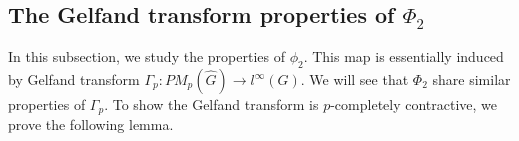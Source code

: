 \documentclass[reqno,11pt]{amsart}
\theoremstyle{plain}
\theoremstyle{definition}
\theoremstyle{remark}
\begin{document}
\subsection{The Gelfand transform properties of $\Phi_2$}


In this subsection, we study the properties of $\phi_2$. This map is essentially  induced by Gelfand transform $\Gamma_p:PM_p(\hat{G})\rightarrow l^\infty(G)$. We will see that $\Phi_2$ share similar properties of $\Gamma_p$. To show the Gelfand transform is $p$-completely contractive, we prove the following lemma.
\end{document}
